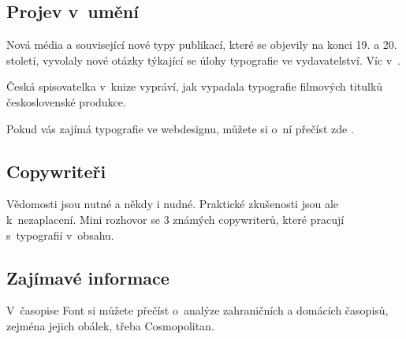 \documentclass[a4paper, 11pt]{article}
\begin{document}
\subsection{Projev v~umění}
Nová média a související nové typy publikací, které se objevily na konci 19. a 20. století, vyvolaly nové otázky týkající se úlohy typografie ve vydavatelství. Víc v~\cite{Media_Research2016}. 

Česká spisovatelka v~knize  \cite{Vacovska2016} vypráví, jak vypadala typografie filmových titulků československé produkce.


Pokud vás zajímá typografie ve webdesignu, můžete si o~ní přečíst zde \cite{Young_scientist2020}.

\subsection{Copywriteři}

Vědomosti jsou nutné a někdy i nudné. Praktické zkušenosti jsou ale k~nezaplacení. Mini rozhovor \cite{Celevicek2018} se 3 známých copywriterů, které pracují s~typografií v~obsahu. 

\subsection{Zajímavé informace}

V~časopise Font \cite{Font2017} si můžete přečíst o~analýze zahraničních a domácích časopisů, zejména jejich obálek, třeba Cosmopolitan.





\newpage


\renewcommand{\refname}{Použitá Literatura}

\end{document}
